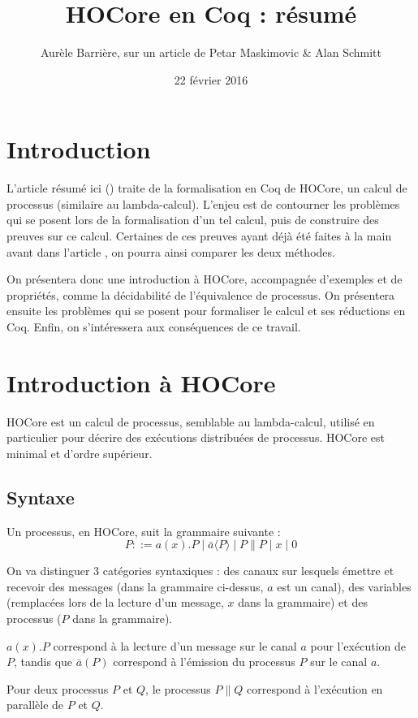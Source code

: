 \documentclass[11pt]{article}
\title{HOCore en Coq : résumé}
\date{22 février 2016}
\author{Aurèle Barrière, sur un article de Petar Maskimovic \& Alan Schmitt}
\begin{document}
\nocite{*}
\maketitle


\section{Introduction}
L'article résumé ici (\cite{hocoreincoq}) traite de la formalisation en Coq de HOCore, un calcul de processus (similaire au lambda-calcul). L'enjeu est de contourner les problèmes qui se posent lors de la formalisation d'un tel calcul, puis de construire des preuves sur ce calcul. Certaines de ces preuves ayant déjà été faites à la main avant dans l'article \cite{expressiveness}, on pourra ainsi comparer les deux méthodes.

On présentera donc une introduction à HOCore, accompagnée d'exemples et de propriétés, comme la décidabilité de l'équivalence de processus.
On présentera ensuite les problèmes qui se posent pour formaliser le calcul et ses réductions en Coq.
Enfin, on s'intéressera aux conséquences de ce travail.

\section{Introduction à HOCore}
HOCore est un calcul de processus, semblable au lambda-calcul, utilisé en particulier pour décrire des exécutions distribuées de processus. HOCore est minimal et d'ordre supérieur. 


\subsection{Syntaxe}
Un processus, en HOCore, suit la grammaire suivante :
$$ P ::= a(x).P \mid \bar{a}\langle P\rangle \mid P\|P \mid x \mid 0 $$

On va distinguer 3 catégories syntaxiques : des canaux sur lesquels émettre et recevoir des messages (dans la grammaire ci-dessus, $a$ est un canal), des variables (remplacées lors de la lecture d'un message, $x$ dans la grammaire) et des processus ($P$ dans la grammaire).

$a(x).P$ correspond à la lecture d'un message sur le canal $a$ pour l'exécution de $P$, tandis que $\bar{a}(P)$ correspond à l'émission du processus $P$ sur le canal $a$.

Pour deux processus $P$ et $Q$, le processus $P\|Q$ correspond à l'exécution en parallèle de $P$ et $Q$.
\end{document}
